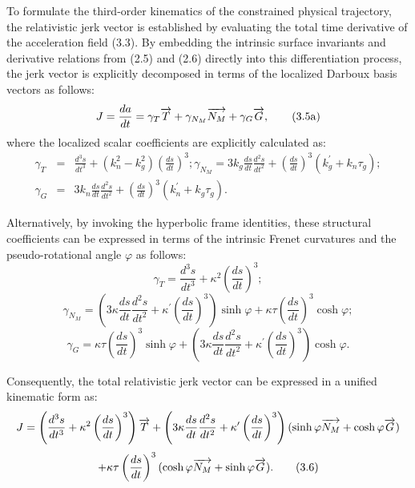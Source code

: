 \documentclass[reqno]{amsart}
\theoremstyle{plain}
\numberwithin{equation}{section}
\begin{document}
To formulate the third-order kinematics of the constrained physical trajectory, the relativistic jerk vector is established by evaluating the total time derivative of the acceleration field (3.3). By embedding the intrinsic surface invariants and derivative relations from (2.5) and (2.6) directly into this differentiation process, the jerk vector is explicitly decomposed in terms of the localized Darboux basis vectors as follows:
\begin{equation}
J=\frac{da}{dt}=\gamma _{T}\overrightarrow{T}+\gamma _{N_{M}}\overrightarrow{%
N_{M}}+\gamma _{G}\overrightarrow{G},  \tag{3.5a}
\end{equation}%
where the localized scalar coefficients are explicitly calculated as:
\begin{eqnarray*}
\gamma _{T} &=&\frac{d^{3}s}{dt^{3}}+(k_{n}^{2}-k_{g}^{2})\left( \frac{ds}{dt%
}\right) ^{3};\gamma _{N_{M}}=3k_{g}\frac{ds}{dt}\frac{d^{2}s}{dt^{2}}%
+\left( \frac{ds}{dt}\right) ^{3}(k_{g}^{\prime }+k_{n}\tau _{g}); \\
\gamma _{G} &=&3k_{n}\frac{ds}{dt}\frac{d^{2}s}{dt^{2}}+\left( \frac{ds}{dt}%
\right) ^{3}(k_{n}^{\prime }+k_{g}\tau _{g}).
\end{eqnarray*}%

Alternatively, by invoking the hyperbolic frame identities, these structural coefficients can be expressed in terms of the intrinsic Frenet curvatures and the pseudo-rotational angle $\varphi$ as follows:
\begin{equation}
\gamma _{T}=\frac{d^{3}s}{dt^{3}}+\kappa ^{2}\left( \frac{ds}{dt}\right)
^{3};  \tag{3.5b}
\end{equation}%
\begin{equation}
\gamma _{N_{M}}=\left( 3\kappa \frac{ds}{dt}\frac{d^{2}s}{dt^{2}}+\kappa
^{\prime }\left( \frac{ds}{dt}\right) ^{3}\right) \sinh \varphi +\kappa \tau
\left( \frac{ds}{dt}\right) ^{3}\cosh \varphi ;  \tag{3.5c}
\end{equation}%
\begin{equation}
\gamma _{G}=\kappa \tau \left( \frac{ds}{dt}\right) ^{3}\sinh \varphi
+\left( 3\kappa \frac{ds}{dt}\frac{d^{2}s}{dt^{2}}+\kappa ^{\prime }\left( 
\frac{ds}{dt}\right) ^{3}\right) \cosh \varphi .  \tag{3.5d}
\end{equation}

Consequently, the total relativistic jerk vector can be expressed in a unified kinematic form as:
\begin{equation*}
J=\left( \frac{d^{3}s}{dt^{3}}+\kappa ^{2}\left( \frac{ds}{dt}\right)
^{3}\right) \overrightarrow{T}+\left( 3\kappa \frac{ds}{dt}\frac{d^{2}s}{%
dt^{2}}+\kappa ^{\prime }\left( \frac{ds}{dt}\right) ^{3}\right) (\sinh
\varphi \overrightarrow{N_{M}}+\cosh \varphi \overrightarrow{G})
\end{equation*}%
\begin{equation}
+\kappa \tau \left( \frac{ds}{dt}\right) ^{3}(\cosh \varphi \overrightarrow{%
N_{M}}+\sinh \varphi \overrightarrow{G}).  \tag{3.6}
\end{equation}
\end{document}
